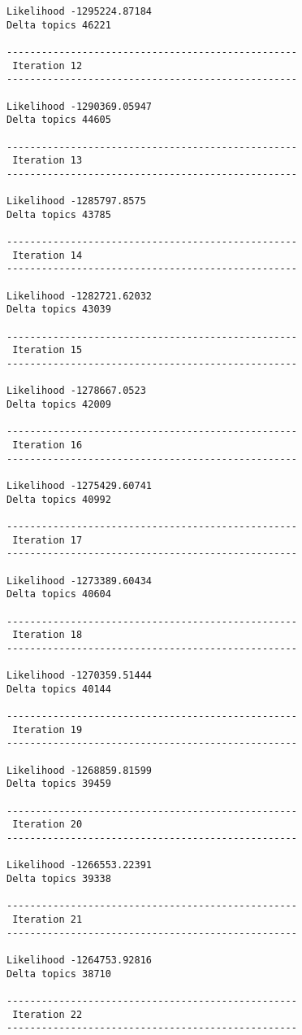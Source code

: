 \documentclass{article}
\begin{document}
\begin{Verbatim}[commandchars=\\\{\}]
Likelihood -1295224.87184
Delta topics 46221 

-------------------------------------------------- 
 Iteration 12 
-------------------------------------------------- 

Likelihood -1290369.05947
Delta topics 44605 

-------------------------------------------------- 
 Iteration 13 
-------------------------------------------------- 

Likelihood -1285797.8575
Delta topics 43785 

-------------------------------------------------- 
 Iteration 14 
-------------------------------------------------- 

Likelihood -1282721.62032
Delta topics 43039 

-------------------------------------------------- 
 Iteration 15 
-------------------------------------------------- 

Likelihood -1278667.0523
Delta topics 42009 

-------------------------------------------------- 
 Iteration 16 
-------------------------------------------------- 

Likelihood -1275429.60741
Delta topics 40992 

-------------------------------------------------- 
 Iteration 17 
-------------------------------------------------- 

Likelihood -1273389.60434
Delta topics 40604 

-------------------------------------------------- 
 Iteration 18 
-------------------------------------------------- 

Likelihood -1270359.51444
Delta topics 40144 

-------------------------------------------------- 
 Iteration 19 
-------------------------------------------------- 

Likelihood -1268859.81599
Delta topics 39459 

-------------------------------------------------- 
 Iteration 20 
-------------------------------------------------- 

Likelihood -1266553.22391
Delta topics 39338 

-------------------------------------------------- 
 Iteration 21 
-------------------------------------------------- 

Likelihood -1264753.92816
Delta topics 38710 

-------------------------------------------------- 
 Iteration 22 
-------------------------------------------------- 


\end{Verbatim}
\end{document}
